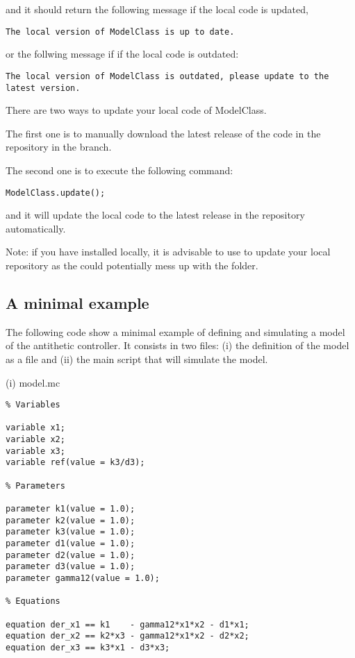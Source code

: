 \documentclass[11pt]{article}
\begin{document}
and it should return the following message if the local code is updated,

\begin{lstlisting}
The local version of ModelClass is up to date.
\end{lstlisting}

or the follwing message if if the local code is outdated:

\begin{lstlisting}
The local version of ModelClass is outdated, please update to the latest version.
\end{lstlisting}

There are two ways to update your local code of ModelClass.

The first one is to manually download the latest release of the code in the repository in the  branch.

The second one is to execute the following command:

\begin{lstlisting}
ModelClass.update();
\end{lstlisting}

and it will update the local code to the latest release in the repository automatically. 

Note: if you have  installed locally, it is advisable to use  to update your local repository as the  could potentially mess up with the  folder.

\subsection{A minimal example}

The following code show a minimal example of defining and simulating a model of the antithetic controller. It consists in two files: (i) the definition of the model as a  file and (ii) the main script that will simulate the model. 

(i) model.mc 

\begin{lstlisting}
% Variables

variable x1;
variable x2;
variable x3;
variable ref(value = k3/d3);

% Parameters

parameter k1(value = 1.0);
parameter k2(value = 1.0);
parameter k3(value = 1.0);
parameter d1(value = 1.0);
parameter d2(value = 1.0);
parameter d3(value = 1.0);
parameter gamma12(value = 1.0);

% Equations

equation der_x1 == k1    - gamma12*x1*x2 - d1*x1;
equation der_x2 == k2*x3 - gamma12*x1*x2 - d2*x2;
equation der_x3 == k3*x1 - d3*x3;
\end{lstlisting}
\end{document}
